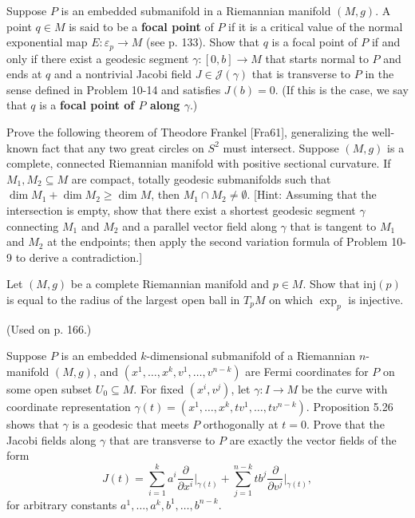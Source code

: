 \begin{exercise}\label{prob:focal-point-characterization}
Suppose $P$ is an embedded submanifold in a Riemannian manifold $(M,g)$. A point $q \in M$ is said to be a \textbf{focal point} of $P$ if it is a critical value of the normal exponential map $E: \varepsilon_p \to M$ (see p. 133). Show that $q$ is a focal point of $P$ if and only if there exist a geodesic segment $\gamma: [0,b] \to M$ that starts normal to $P$ and ends at $q$ and a nontrivial Jacobi field $J \in \mathcal{J}(\gamma)$ that is transverse to $P$ in the sense defined in Problem 10-14 and satisfies $J(b) = 0$. (If this is the case, we say that $q$ is a \textbf{focal point of $P$ along $\gamma$}.)
\end{exercise}

\begin{exercise}\label{prob:frankel-geodesic-intersection}
Prove the following theorem of Theodore Frankel [Fra61], generalizing the well-known fact that any two great circles on $S^2$ must intersect. Suppose $(M, g)$ is a complete, connected Riemannian manifold with positive sectional curvature. If $M_1, M_2 \subseteq M$ are compact, totally geodesic submanifolds such that $\dim M_1 + \dim M_2 \geq \dim M$, then $M_1 \cap M_2 \neq \emptyset$. [Hint: Assuming that the intersection is empty, show that there exist a shortest geodesic segment $\gamma$ connecting $M_1$ and $M_2$ and a parallel vector field along $\gamma$ that is tangent to $M_1$ and $M_2$ at the endpoints; then apply the second variation formula of Problem 10-9 to derive a contradiction.]
\end{exercise}

\begin{exercise}\label{prob:injectivity-radius-exponential}
Let $(M,g)$ be a complete Riemannian manifold and $p \in M$. Show that $\text{inj}(p)$ is equal to the radius of the largest open ball in $T_p M$ on which $\exp_p$ is injective.

(Used on p. 166.)
\end{exercise}

\begin{exercise}
\label{prob:jacobi-fermi-transverse}

Suppose $P$ is an embedded $k$-dimensional submanifold of a Riemannian $n$-manifold $(M,g)$, and $(x^1,\ldots,x^k,v^1,\ldots,v^{n-k})$ are Fermi coordinates for $P$ on some open subset $U_0 \subseteq M$. For fixed $(x^i,v^j)$, let $\gamma: I \to M$ be the curve with coordinate representation $\gamma(t) = (x^1,\ldots,x^k,tv^1,\ldots,tv^{n-k})$. Proposition 5.26 shows that $\gamma$ is a geodesic that meets $P$ orthogonally at $t=0$. Prove that the Jacobi fields along $\gamma$ that are transverse to $P$ are exactly the vector fields of the form
\[
J(t) = \sum_{i=1}^{k} a^i \frac{\partial}{\partial x^i}\bigg|_{\gamma(t)} + \sum_{j=1}^{n-k} t b^j \frac{\partial}{\partial v^j}\bigg|_{\gamma(t)},
\]
for arbitrary constants $a^1,\ldots,a^k,b^1,\ldots,b^{n-k}$.
\end{exercise}

